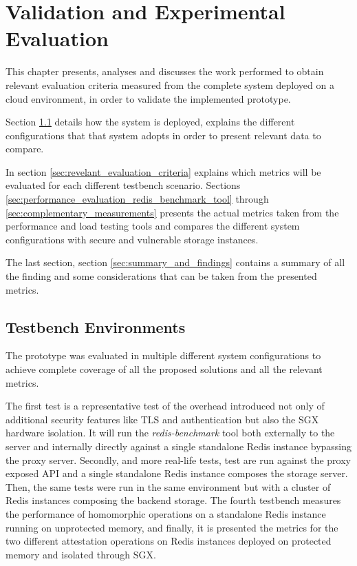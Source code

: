 
\chapter{Validation and Experimental Evaluation}
\label{cha:validation_experimental_Evaluation}

This chapter presents, analyses and discusses the work performed to obtain relevant evaluation criteria measured from the complete system deployed on a cloud environment, in order to validate the implemented prototype.

Section \ref{sec:testbench_environment} details how the system is deployed, explains the different configurations that that system adopts in order to present relevant data to compare.

In section \ref{sec:revelant_evaluation_criteria} explains which metrics will be evaluated for each different testbench scenario. Sections \ref{sec:performance_evaluation_redis_benchmark_tool} through \ref{sec:complementary_measurements} presents the actual metrics taken from the performance and load testing tools and compares the different system configurations with secure and vulnerable storage instances.

The last section, section \ref{sec:summary_and_findings} contains a summary of all the finding and some considerations that can be taken from the presented metrics.

\section{Testbench Environments}
\label{sec:testbench_environment}

The prototype was evaluated in multiple different system configurations to achieve complete coverage of all the proposed solutions and all the relevant metrics. 

The first test is a representative test of the overhead introduced not only of additional security features like \gls{TLS} and authentication but also the \gls{SGX} hardware isolation. It will run the \textit{redis-benchmark} tool both externally to the server and internally directly against a single standalone Redis instance bypassing the proxy server. Secondly, and more real-life tests, test are run against the proxy exposed \gls{API} and a single standalone Redis instance composes the storage server. Then, the same tests were run in the same environment but with a cluster of Redis instances composing the backend storage. The fourth testbench measures the performance of homomorphic operations on a standalone Redis instance running on unprotected memory, and finally, it is presented the metrics for the two different attestation operations on Redis instances deployed on protected memory and isolated through \gls{SGX}.

